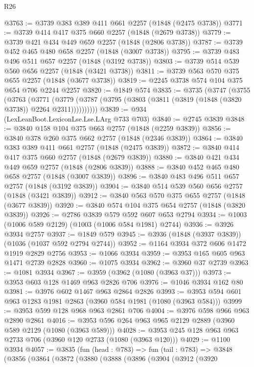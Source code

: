 \begin{lexlean}{R26}
\begin{coremodule}
@3763 := @3739 @383 @389 @411 @661 @2257 (@1848 (@2475 @3738))
@3771 := @3739 @414 @417 @375 @660 @2257 (@1848 (@2679 @3738))
@3779 := @3739 @421 @434 @449 @659 @2257 (@1848 (@2806 @3738))
@3787 := @3739 @452 @465 @480 @658 @2257 (@1848 (@3007 @3738))
@3795 := @3739 @483 @496 @511 @657 @2257 (@1848 (@3192 @3738))
@3803 := @3739 @514 @539 @560 @656 @2257 (@1848 (@3421 @3738))
@3811 := @3739 @563 @570 @375 @655 @2257 (@1848 (@3677 @3738))
@3819 := @2245 @3738 @574 @104 @375 @654 @706 @2244 @2257
@3820 := @1849 @574
@3835 := @3735
    (@3747
      (@3755
        (@3763
          (@3771
            (@3779 (@3787 (@3795 (@3803 (@3811 (@3819 (@1848 (@3820 @3738)) @2264 @2311))))))))))
@3839 := @934 (LexLeanBoot.LexiconLse.Lse.LArg @733 @703)
@3840 := @2745 @3839
@3848 := @3840 @158 @104 @375 @663 @2757 (@1848 (@2259 @3839))
@3856 := @3840 @378 @260 @375 @662 @2757 (@1848 (@2346 @3839))
@3864 := @3840 @383 @389 @411 @661 @2757 (@1848 (@2475 @3839))
@3872 := @3840 @414 @417 @375 @660 @2757 (@1848 (@2679 @3839))
@3880 := @3840 @421 @434 @449 @659 @2757 (@1848 (@2806 @3839))
@3888 := @3840 @452 @465 @480 @658 @2757 (@1848 (@3007 @3839))
@3896 := @3840 @483 @496 @511 @657 @2757 (@1848 (@3192 @3839))
@3904 := @3840 @514 @539 @560 @656 @2757 (@1848 (@3421 @3839))
@3912 := @3840 @563 @570 @375 @655 @2757 (@1848 (@3677 @3839))
@3920 := @3840 @574 @104 @375 @654 @2757 (@1848 (@3820 @3839))
@3926 := @2786 @3839 @579 @592 @607 @653 @2794
@3934 := @1003 (@1006 @589 @2129) (@1003 (@1006 @584 @1981) @2744)
@3936 := @3926 @3934 @2757
@3937 := @1849 @579
@3945 := @3936 (@1848 (@3937 @3839)) (@1036 (@1037 @592 @2794 @2744))
@3952 := @1164 @3934 @372 @606 @1472 @1919 @2829 @2756
@3953 := @1066 @3934
@3959 := @3953 @165 @605 @963 @1471 @2739 @2828
@3960 := @1075 @3934
@3962 := @3960 @37 @2739
@3963 := @1081 @3934
@3967 := @3959 (@3962 (@1080 (@3963 @37)))
@3973 := @3953 @603 @128 @1469 @963 @2826 @706
@3976 := @1046 @3934 @162 @80
@3981 := @3976 @602 @1467 @963 @2864 @2826
@3993 := @3953 @594 @601 @963 @1283 @1981 @2863 (@3960 @584 @1981 (@1080 (@3963 @584)))
@3999 := @3953 @599 @128 @968 @963 @2861 @706
@4004 := @3976 @598 @966 @963 @2890 @2861
@4016 := @3953 @596 @264 @963 @965 @2129 @2889 (@3960 @589 @2129 (@1080 (@3963 @589)))
@4028 := @3953 @245 @128 @963 @963 @2733 @706 (@3960 @120 @2733 (@1080 (@3963 @120)))
@4029 := @1100 @3934
@4057 := @3835
    (fun (head : @783) =>
    fun (tail : @783) =>
    @3848
      (@3856
        (@3864
          (@3872
            (@3880
              (@3888
                (@3896
                  (@3904
                    (@3912
                      (@3920

\end{coremodule}
\end{lexlean}
